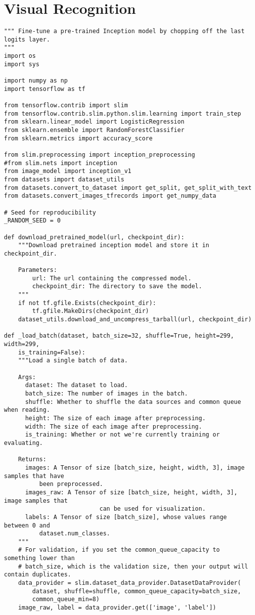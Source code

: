 \section{Visual Recognition}
\begin{lstlisting}
""" Fine-tune a pre-trained Inception model by chopping off the last logits layer. 
"""
import os
import sys

import numpy as np
import tensorflow as tf

from tensorflow.contrib import slim
from tensorflow.contrib.slim.python.slim.learning import train_step
from sklearn.linear_model import LogisticRegression
from sklearn.ensemble import RandomForestClassifier
from sklearn.metrics import accuracy_score

from slim.preprocessing import inception_preprocessing
#from slim.nets import inception
from image_model import inception_v1
from datasets import dataset_utils
from datasets.convert_to_dataset import get_split, get_split_with_text
from datasets.convert_images_tfrecords import get_numpy_data

# Seed for reproducibility
_RANDOM_SEED = 0

def download_pretrained_model(url, checkpoint_dir):
    """Download pretrained inception model and store it in checkpoint_dir.

    Parameters:
        url: The url containing the compressed model.
        checkpoint_dir: The directory to save the model.
    """
    if not tf.gfile.Exists(checkpoint_dir):
        tf.gfile.MakeDirs(checkpoint_dir)
    dataset_utils.download_and_uncompress_tarball(url, checkpoint_dir)

def _load_batch(dataset, batch_size=32, shuffle=True, height=299, width=299, 
    is_training=False):
    """Load a single batch of data. 
    
    Args:
      dataset: The dataset to load.
      batch_size: The number of images in the batch.
      shuffle: Whether to shuffle the data sources and common queue when reading.
      height: The size of each image after preprocessing.
      width: The size of each image after preprocessing.
      is_training: Whether or not we're currently training or evaluating.
    
    Returns:
      images: A Tensor of size [batch_size, height, width, 3], image samples that have 
          been preprocessed.
      images_raw: A Tensor of size [batch_size, height, width, 3], image samples that 
                           can be used for visualization.
      labels: A Tensor of size [batch_size], whose values range between 0 and 
          dataset.num_classes.
    """
    # For validation, if you set the common_queue_capacity to something lower than
    # batch_size, which is the validation size, then your output will contain duplicates.
    data_provider = slim.dataset_data_provider.DatasetDataProvider(
        dataset, shuffle=shuffle, common_queue_capacity=batch_size,
        common_queue_min=8)
    image_raw, label = data_provider.get(['image', 'label'])
    

\end{lstlisting}

